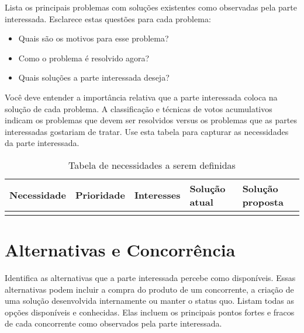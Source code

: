 \documentclass{report}
\begin{document}
Lista os principais problemas com soluções existentes como observadas pela
parte interessada. Esclarece estas questões para cada problema:

\begin{itemize}

	\item
	      Quais são os motivos para esse problema?

	\item
	      Como o problema é resolvido agora?

	\item
	      Quais soluções a parte interessada deseja?

\end{itemize}

Você deve entender a importância relativa que a parte interessada coloca na
solução de cada problema. A classificação e técnicas de votos acumulativos
indicam os problemas que devem ser resolvidos versus os problemas que as partes
interessadas gostariam de tratar. Use esta tabela para capturar as necessidades
da parte interessada.

\begin{table}[H]
	\centering

	\begin{tabularx}{\textwidth}{X|X|X|X|X}
		\textbf{Necessidade} & \textbf{Prioridade} & \textbf{Interesses} & \textbf{Solução atual} & \textbf{Solução proposta} \\
		\hline
		                     &                     &                     &                        &                           \\
		\hline
	\end{tabularx}

	\caption[Tabela de necessidades]{Tabela de necessidades a serem definidas}

	\label{tab:necessidades}

\end{table}

\section{Alternativas e Concorrência}

Identifica as alternativas que a parte interessada percebe como disponíveis.
Essas alternativas podem incluir a compra do produto de um concorrente, a
criação de uma solução desenvolvida internamente ou manter o status quo. Listam
todas as opções disponíveis e conhecidas. Elas incluem os principais pontos
fortes e fracos de cada concorrente como observados pela parte interessada.
\end{document}
